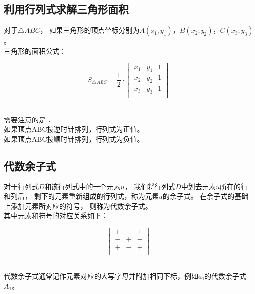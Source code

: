 \documentclass[UTF8]{ctexart}
\begin{document}
\subsection{利用行列式求解三角形面积}
    对于$\triangle ABC$，
    如果三角形的顶点坐标分别为$A(x_1,y_1)$，$B(x_2,y_2)$，$C(x_3,y_3)$。\\[3mm]
    三角形的面积公式：
    \begin{large}
        \begin{equation*}
            S_{\triangle ABC}=\frac{1}{2}\cdot
            \begin{vmatrix}
                x_1&y_1&1\\
                x_2&y_2&1\\
                x_3&y_3&1\\
            \end{vmatrix}
        \end{equation*}
    \end{large}\\
    需要注意的是：\\[3mm]
    如果顶点ABC按逆时针排列，行列式为正值。\\[3mm]
    如果顶点ABC按顺时针排列，行列式为负值。\\[3mm]

\newpage

\subsection{代数余子式}
    对于行列式$D$和该行列式中的一个元素$u$，
    我们将行列式$D$中划去元素$u$所在的行和列后，
    剩下的元素重新组成的行列式，称为元素$u$的余子式。
    在余子式的基础上添加元素所对应的符号，
    则称为代数余子式。\\[3mm]
    其中元素和符号的对应关系如下：
    \begin{large}
        \begin{equation*}
            \begin{vmatrix}
                +&-&+\\
                -&+&-\\
                +&-&+\\
            \end{vmatrix}
        \end{equation*}
    \end{large}\\
    代数余子式通常记作元素对应的大写字母并附加相同下标，例如$a_1$的代数余子式$A_1$。
\end{document}
